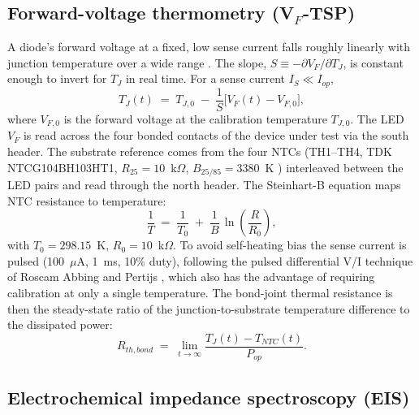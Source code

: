\documentclass[conference]{IEEEtran}
\begin{document}
\subsection{Forward-voltage thermometry (V$_F$-TSP)}

A diode's forward voltage at a fixed, low sense current falls roughly
linearly with junction temperature over a wide range
\cite{pangallo2018direct}. The slope, $S \equiv -\partial V_F / \partial
T_J$, is constant enough to invert for $T_J$ in real time. For a sense
current $I_S \ll I_{op}$,
\begin{equation}
  T_J(t) \;=\; T_{J,0} \;-\; \frac{1}{S}\bigl[V_F(t) - V_{F,0}\bigr],
  \label{eq:vftsp}
\end{equation}
where $V_{F,0}$ is the forward voltage at the calibration temperature
$T_{J,0}$. The LED $V_F$ is read across the four bonded contacts of the
device under test via the south header. The substrate reference comes from the four
NTCs (TH1--TH4, TDK NTCG104BH103HT1, $R_{25}=10$~k$\Omega$, $B_{25/85}=3380$~K
\cite{tdk_ntcg104}) interleaved between the LED pairs and read through
the north header. The Steinhart-B equation maps NTC resistance to
temperature:
\begin{equation}
  \frac{1}{T} \;=\; \frac{1}{T_0} \;+\; \frac{1}{B}\,\ln\!\left(\frac{R}{R_0}\right),
  \label{eq:ntc}
\end{equation}
with $T_0 = 298.15$~K, $R_0 = 10$~k$\Omega$. To avoid self-heating bias
the sense current is pulsed (100~$\mu$A, 1~ms, 10\% duty), following the
pulsed differential V/I technique of Roscam Abbing and Pertijs
\cite{roscamabbing2011led}, which also has the advantage of requiring
calibration at only a single temperature. The bond-joint thermal resistance is then the
steady-state ratio of the junction-to-substrate temperature difference to
the dissipated power:
\begin{equation}
  R_{th,bond} \;=\; \lim_{t \to \infty}\frac{T_J(t) - T_{NTC}(t)}{P_{op}}.
\end{equation}

\subsection{Electrochemical impedance spectroscopy (EIS)}
\end{document}
